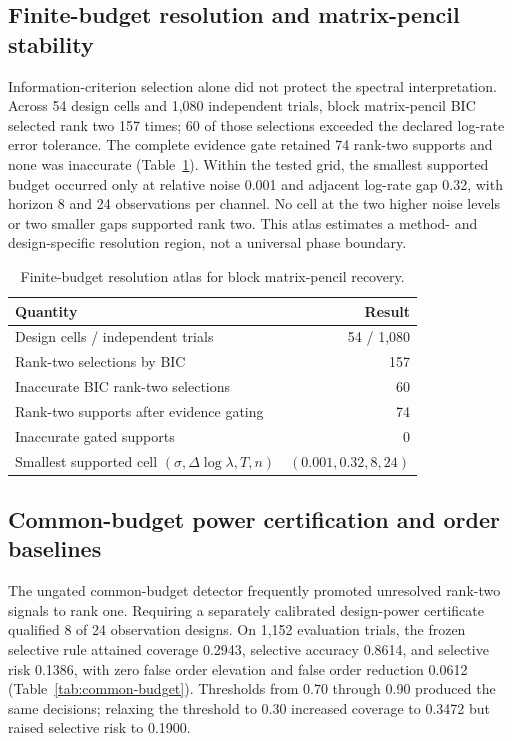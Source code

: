 \documentclass[11pt]{article}
\begin{document}
\subsection{Finite-budget resolution and matrix-pencil stability}
Information-criterion selection alone did not protect the spectral interpretation. Across 54 design cells and 1,080 independent trials, block matrix-pencil BIC selected rank two 157 times; 60 of those selections exceeded the declared log-rate error tolerance. The complete evidence gate retained 74 rank-two supports and none was inaccurate (Table~\ref{tab:resolution-atlas}). Within the tested grid, the smallest supported budget occurred only at relative noise 0.001 and adjacent log-rate gap 0.32, with horizon 8 and 24 observations per channel. No cell at the two higher noise levels or two smaller gaps supported rank two. This atlas estimates a method- and design-specific resolution region, not a universal phase boundary.

\begin{table}[H]
\centering
\caption{Finite-budget resolution atlas for block matrix-pencil recovery.}
\label{tab:resolution-atlas}
\begin{tabular}{lr}
\toprule
Quantity & Result \\
\midrule
Design cells / independent trials & 54 / 1,080 \\
Rank-two selections by BIC & 157 \\
Inaccurate BIC rank-two selections & 60 \\
Rank-two supports after evidence gating & 74 \\
Inaccurate gated supports & 0 \\
Smallest supported cell $(\sigma,\Delta\log\lambda,T,n)$ & $(0.001,0.32,8,24)$ \\
\bottomrule
\end{tabular}
\end{table}

\subsection{Common-budget power certification and order baselines}
The ungated common-budget detector frequently promoted unresolved rank-two signals to rank one. Requiring a separately calibrated design-power certificate qualified 8 of 24 observation designs. On 1,152 evaluation trials, the frozen selective rule attained coverage 0.2943, selective accuracy 0.8614, and selective risk 0.1386, with zero false order elevation and false order reduction 0.0612 (Table~\ref{tab:common-budget}). Thresholds from 0.70 through 0.90 produced the same decisions; relaxing the threshold to 0.30 increased coverage to 0.3472 but raised selective risk to 0.1900.
\end{document}
